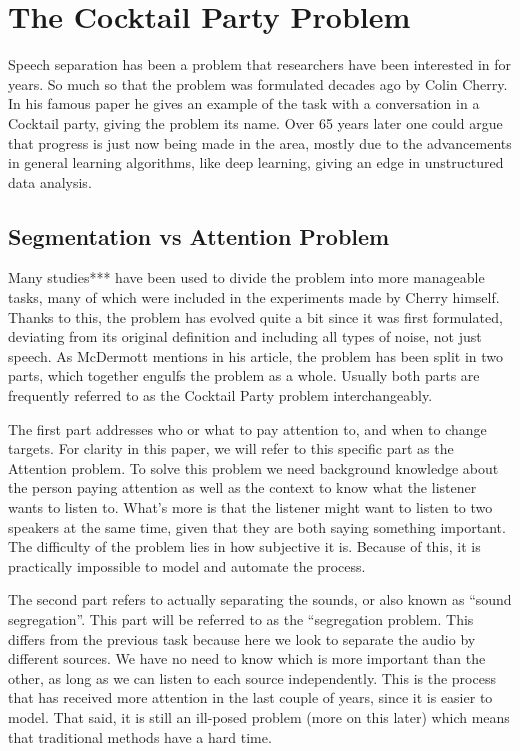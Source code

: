 \documentclass{book}
\begin{document}
\chapter{The Cocktail Party Problem}
\qquad Speech separation has been a problem that researchers have been interested in for years. So much so that the problem was formulated decades ago by Colin Cherry\cite{Cherry}. In his famous paper he gives an example of the task with a conversation in a Cocktail party, giving the problem its name. Over 65 years later one could argue that progress is just now being made in the area, mostly due to the advancements in general learning algorithms, like deep learning, giving an edge in unstructured data analysis.

\section{Segmentation vs Attention Problem}
\qquad Many studies*** have been used to divide the problem into more manageable tasks, many of which were included in the experiments made by Cherry himself. Thanks to this, the problem has evolved quite a bit since it was first formulated, deviating from its original definition and including all types of noise, not just speech. As McDermott mentions in his article\cite{CocktailPartyProblemRevisit}, the problem has been split in two parts, which together engulfs the problem as a whole. Usually both parts are frequently referred to as the Cocktail Party problem interchangeably.
\par
The first part addresses who or what to pay attention to, and when to change targets. For clarity in this paper, we will refer to this specific part as the Attention problem. To solve this problem we need background knowledge about the person paying attention as well as the context to know what the listener wants to listen to. What's more is that the listener might want to listen to two speakers at the same time, given that they are both saying something important. The difficulty of the problem lies in how subjective it is. Because of this, it is practically impossible to model and automate the process.
\par
The second part refers to actually separating the sounds, or also known as “sound segregation”. This part will be referred to as the “segregation problem. This differs from the previous task because here we look to separate the audio by different sources. We have no need to know which is more important than the other, as long as we can listen to each source independently. This is the process that has received more attention in the last couple of years, since it is easier to model. That said, it is still an ill-posed problem (more on this later) which means that traditional methods have a hard time.
\end{document}

